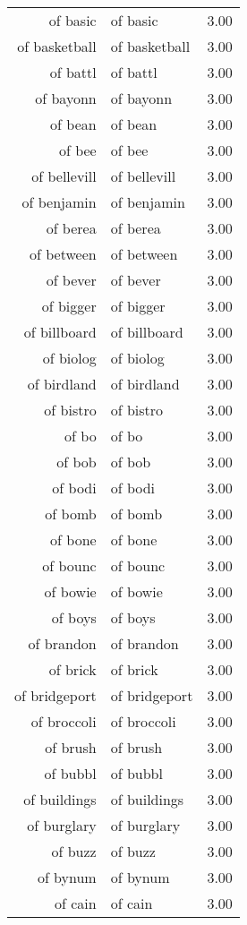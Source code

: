 \begin{table}[ht]
\begin{tabular}{rlr}
  of basic & of basic & 3.00 \\ 
  of basketball & of basketball & 3.00 \\ 
  of battl & of battl & 3.00 \\ 
  of bayonn & of bayonn & 3.00 \\ 
  of bean & of bean & 3.00 \\ 
  of bee & of bee & 3.00 \\ 
  of bellevill & of bellevill & 3.00 \\ 
  of benjamin & of benjamin & 3.00 \\ 
  of berea & of berea & 3.00 \\ 
  of between & of between & 3.00 \\ 
  of bever & of bever & 3.00 \\ 
  of bigger & of bigger & 3.00 \\ 
  of billboard & of billboard & 3.00 \\ 
  of biolog & of biolog & 3.00 \\ 
  of birdland & of birdland & 3.00 \\ 
  of bistro & of bistro & 3.00 \\ 
  of bo & of bo & 3.00 \\ 
  of bob & of bob & 3.00 \\ 
  of bodi & of bodi & 3.00 \\ 
  of bomb & of bomb & 3.00 \\ 
  of bone & of bone & 3.00 \\ 
  of bounc & of bounc & 3.00 \\ 
  of bowie & of bowie & 3.00 \\ 
  of boys & of boys & 3.00 \\ 
  of brandon & of brandon & 3.00 \\ 
  of brick & of brick & 3.00 \\ 
  of bridgeport & of bridgeport & 3.00 \\ 
  of broccoli & of broccoli & 3.00 \\ 
  of brush & of brush & 3.00 \\ 
  of bubbl & of bubbl & 3.00 \\ 
  of buildings & of buildings & 3.00 \\ 
  of burglary & of burglary & 3.00 \\ 
  of buzz & of buzz & 3.00 \\ 
  of bynum & of bynum & 3.00 \\ 
  of cain & of cain & 3.00 \\ 

\end{tabular}
\end{table}
